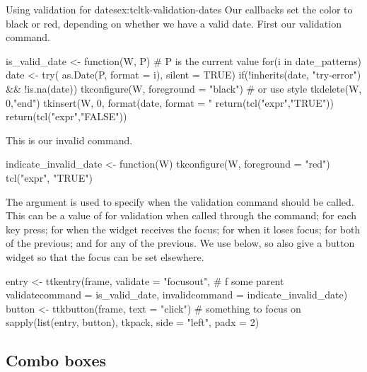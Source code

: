\begin{example}{Using validation for dates}{ex:tcltk-validation-dates}
Our callbacks set the color to black or red, depending on whether we
have a valid date. First our validation command.
\begin{Schunk}
\begin{Sinput}
 is_valid_date <- function(W, P) { # P is the current value
   for(i in date_patterns) {
     date <- try( as.Date(P, format = i), silent = TRUE)
     if(!inherits(date, "try-error") && !is.na(date)) {
       tkconfigure(W, foreground = "black")  # or use style
       tkdelete(W, 0,"end")
       tkinsert(W, 0, format(date, format = "%
       return(tcl("expr","TRUE"))        
     } 
   }
   return(tcl("expr","FALSE"))
 }
\end{Sinput}
\end{Schunk}

This is our invalid command.
\begin{Schunk}
\begin{Sinput}
 indicate_invalid_date <- function(W) {
   tkconfigure(W, foreground = "red")
   tcl("expr", "TRUE")
 }
\end{Sinput}
\end{Schunk}


The  argument is used to specify when the
validation command should be called. This can be a value of
 for validation when called through the 
command;  for each key press;  for when the
widget receives the focus;  for when it loses focus;
 for both of the previous; and  for any of the
previous. We use  below, so also give a button widget
so that the focus can be set elsewhere. 
\begin{Schunk}
\begin{Sinput}
 entry <- ttkentry(frame, validate = "focusout", # f some parent
               validatecommand = is_valid_date,
               invalidcommand = indicate_invalid_date)
 button <- ttkbutton(frame, text = "click")        # something to focus on
 sapply(list(entry, button), tkpack, side = "left", padx = 2)
\end{Sinput}
\end{Schunk}
              
\end{example}


\subsection{Combo boxes}
\label{sec:tcltk:comboboxes}

